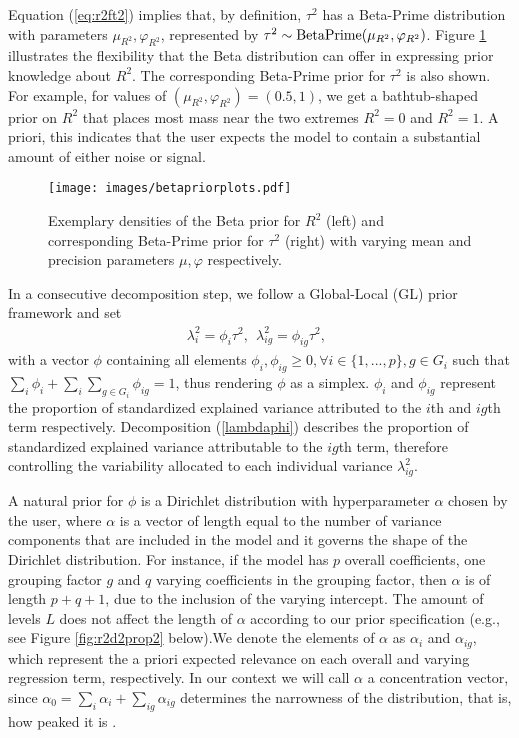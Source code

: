 Equation (\ref{eq:r2ft2}) implies that, by definition, $\tau^2$ has a Beta-Prime distribution with parameters $\mu_{R^2}, \varphi_{R^2}$, represented by $\tau^2 \sim \text{BetaPrime}(\mu_{R^2}, \varphi_{R^2})$. Figure \ref{fig:betapriors} illustrates the flexibility that the Beta distribution can offer in expressing prior knowledge about $R^2$. The corresponding Beta-Prime prior for $\tau^2$ is also shown. For example, for values of $(\mu_{R^2},\varphi_{R^2})=(0.5,1)$, we get a bathtub-shaped prior on $R^2$ that places most mass near the two extremes $R^2=0$ and $R^2=1$. A priori, this indicates that the user expects the model to contain a substantial amount of either noise or signal.

 \begin{figure}[t!]%
    \centering
    \texttt{[image: images/betapriorplots.pdf]}
    \caption{Exemplary densities of the Beta prior for $R^2$ (left) and corresponding Beta-Prime prior for $\tau^2$ (right) with varying mean and precision parameters $\mu, \varphi$ respectively.}
    \label{fig:betapriors}
\end{figure}
In a consecutive decomposition step, we follow a Global-Local (GL) prior framework and set
\begin{align}
	\label{lambdaphi}
	\lambda_i^2=\phi_i\tau^2,\ \ \lambda_{ig}^2=  \phi_{ig}\tau^2  , \ \
\end{align}
with a vector $\phi$ containing all elements $ \phi_i, \phi_{ig} \geq 0, \forall i \in \{1,...,p\},g \in G_i$ such that $\sum_{i}\phi_i+\sum_{i}\sum_{g \in G_i}  \phi_{ig}  =1$, thus rendering $\phi$ as a simplex. $\phi_i$ and $\phi_{ig}$ represent the proportion of standardized explained variance attributed to the $i$th and $ig$th term respectively. Decomposition (\ref{lambdaphi}) describes the proportion of standardized explained variance attributable to the $ig$th term, therefore controlling the variability allocated to each individual variance $\lambda_{ig}^2$.

A natural prior for $\phi$ is a Dirichlet distribution with hyperparameter $\alpha$ chosen by the user, where $\alpha$ is a vector of length equal to the number of variance components that are included in the model and it governs the shape of the Dirichlet distribution. For instance, if the model has $p$ overall coefficients, one grouping factor $g$ and $q$ varying coefficients in the grouping factor, then $\alpha$ is of length $p+q+1$, due to the inclusion of the varying intercept. The amount of levels $L$ does not affect the length of $\alpha$ according to our prior specification (e.g., see Figure \ref{fig:r2d2prop2} below).We denote the elements of $\alpha$ as $\alpha_i$ and $\alpha_{ig}$, which represent the a priori expected relevance on each overall and varying regression term, respectively. In our context we will call $\alpha$ a concentration vector, since $\alpha_0= \sum_{i}\alpha_i+\sum_{ig}\alpha_{ig}$ determines the narrowness of the distribution, that is, how peaked it is \citep{OnTheDirichlet}.

